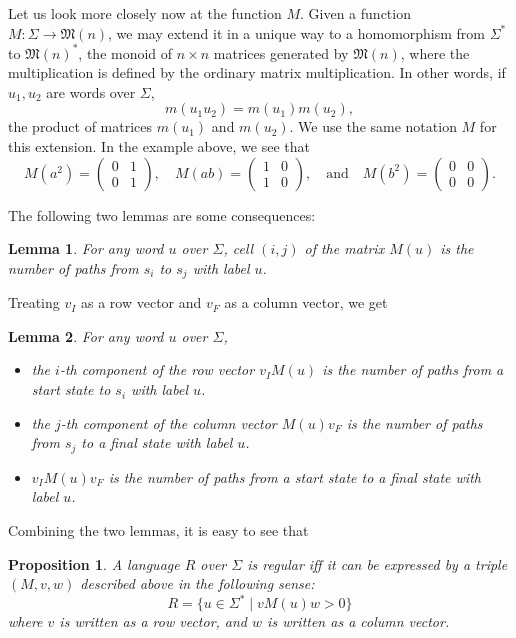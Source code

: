\documentclass[12pt]{article}
\newtheorem{prop}{Proposition}
\newtheorem{lem}{Lemma}
\begin{document}
Let us look more closely now at the function $M$.  Given a function $M:\Sigma \to \mathfrak{M}(n)$, we may extend it in a unique way to a homomorphism from $\Sigma^*$ to $\mathfrak{M}(n)^*$, the monoid of $n\times n$ matrices generated by $\mathfrak{M}(n)$, where the multiplication is defined by the ordinary matrix multiplication.  In other words, if $u_1,u_2$ are words over $\Sigma$, $$m(u_1u_2)=m(u_1)m(u_2),$$ the product of matrices $m(u_1)$ and $m(u_2)$.  We use the same notation $M$ for this extension.  In the example above, we see that
$$M(a^2) = \left(\begin{array}{ccc} 0 & 1 \\ 0 & 1 \end{array} \right), \quad 
M(ab) = \left(\begin{array}{ccc} 1 & 0 \\ 1 & 0 \end{array} \right), \quad \mbox{and} \quad
M(b^2) = \left(\begin{array}{ccc} 0 & 0 \\ 0 & 0 \end{array} \right).$$

The following two lemmas are some consequences:

\begin{lem} For any word $u$ over $\Sigma$, cell $(i,j)$ of the matrix $M(u)$ is the number of paths from $s_i$ to $s_j$ with label $u$.  \end{lem}

Treating $v_I$ as a row vector and $v_F$ as a column vector, we get

\begin{lem} For any word $u$ over $\Sigma$, 
\begin{itemize}
\item the $i$-th component of the row vector $v_I M(u)$ is the number of paths from a start state to $s_i$ with label $u$.  
\item the $j$-th component of the column vector $M(u) v_F$ is the number of paths from $s_j$ to a final state with label $u$.
\item $v_I M(u) v_F$ is the number of paths from a start state to a final state with label $u$.
\end{itemize}
\end{lem}

Combining the two lemmas, it is easy to see that

\begin{prop}  A language $R$ over $\Sigma$ is regular iff it can be expressed by a triple $(M,v,w)$ described above in the following sense: $$R=\lbrace u\in \Sigma^* \mid vM(u)w > 0 \rbrace$$ where $v$ is written as a row vector, and $w$ is written as a column vector.
\end{prop}
\end{document}
